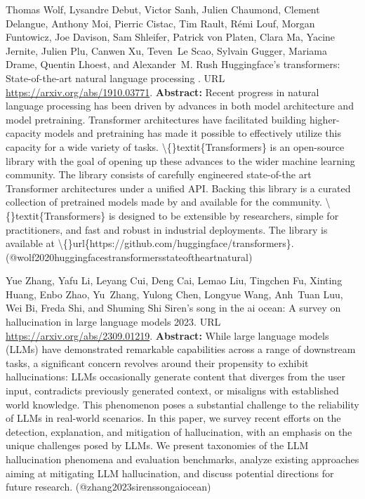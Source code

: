 \documentclass{article} %
\begin{document}
\begin{thebibliography}{}
 Thomas Wolf, Lysandre Debut, Victor Sanh, Julien Chaumond, Clement Delangue, Anthony Moi, Pierric Cistac, Tim Rault, Rémi Louf, Morgan Funtowicz, Joe Davison, Sam Shleifer, Patrick von Platen, Clara Ma, Yacine Jernite, Julien Plu, Canwen Xu, Teven~Le Scao, Sylvain Gugger, Mariama Drame, Quentin Lhoest, and Alexander~M. Rush \newblock Huggingface's transformers: State-of-the-art natural language processing . \newblock URL \url{https://arxiv.org/abs/1910.03771}. \newblock \textbf{Abstract:} Recent progress in natural language processing has been driven by advances in both model architecture and model pretraining. Transformer architectures have facilitated building higher-capacity models and pretraining has made it possible to effectively utilize this capacity for a wide variety of tasks. \textbackslash\{\}textit\{Transformers\} is an open-source library with the goal of opening up these advances to the wider machine learning community. The library consists of carefully engineered state-of-the art Transformer architectures under a unified API. Backing this library is a curated collection of pretrained models made by and available for the community. \textbackslash\{\}textit\{Transformers\} is designed to be extensible by researchers, simple for practitioners, and fast and robust in industrial deployments. The library is available at \textbackslash\{\}url\{https://github.com/huggingface/transformers\}. \newblock (@wolf2020huggingfacestransformersstateoftheartnatural)

 Yue Zhang, Yafu Li, Leyang Cui, Deng Cai, Lemao Liu, Tingchen Fu, Xinting Huang, Enbo Zhao, Yu~Zhang, Yulong Chen, Longyue Wang, Anh~Tuan Luu, Wei Bi, Freda Shi, and Shuming Shi \newblock Siren's song in the ai ocean: A survey on hallucination in large language models 2023. \newblock URL \url{https://arxiv.org/abs/2309.01219}. \newblock \textbf{Abstract:} While large language models (LLMs) have demonstrated remarkable capabilities across a range of downstream tasks, a significant concern revolves around their propensity to exhibit hallucinations: LLMs occasionally generate content that diverges from the user input, contradicts previously generated context, or misaligns with established world knowledge. This phenomenon poses a substantial challenge to the reliability of LLMs in real-world scenarios. In this paper, we survey recent efforts on the detection, explanation, and mitigation of hallucination, with an emphasis on the unique challenges posed by LLMs. We present taxonomies of the LLM hallucination phenomena and evaluation benchmarks, analyze existing approaches aiming at mitigating LLM hallucination, and discuss potential directions for future research. \newblock (@zhang2023sirenssongaiocean)


\end{thebibliography}
\end{document}
